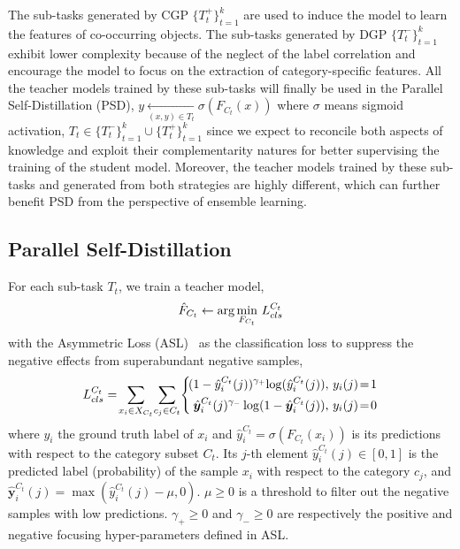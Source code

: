 \documentclass{article}
\begin{document}
The sub-tasks generated by CGP $\{T^+_t\}_{t=1}^k$ are used to induce the model to learn the features of co-occurring objects. The sub-tasks generated by DGP $\{T^-_t\}_{t=1}^k$ exhibit lower complexity because of the neglect of the label correlation and encourage the model to focus on the extraction of category-specific features. All the teacher models trained by these sub-tasks will finally be used in the Parallel Self-Distillation (PSD), $y\underset{(x,y)\in T_t}\leftarrow \sigma(F_{C_t}(x))$ where $\sigma$ means sigmoid activation, $T_t \in \{T^-_t\}_{t=1}^k\cup\{T^+_t\}_{t=1}^k$ since we expect to reconcile both aspects of knowledge and exploit their complementarity natures for better supervising the training of the student model. Moreover, the teacher models trained by these sub-tasks and generated from both strategies are highly different, which can further benefit PSD from the perspective of ensemble learning.

\vspace{-0.15cm}
\subsection{Parallel Self-Distillation}
\vspace{-0.05cm}

For each sub-task $T_t$, we train a teacher model,
\begin{equation}\label{teacher_train}
\setlength{\abovedisplayskip}{3pt}
\setlength{\belowdisplayskip}{1mm}
\hat{F}_{C_t}\leftarrow\arg\underset{F_{C_t}}\min~L^{C_t}_{cls}
\end{equation}
with the Asymmetric Loss (ASL)~\cite{ridnik2021asymmetric} as the classification loss to suppress the negative effects from superabundant negative samples,
{\small
\begin{equation}\label{asl}
    \setlength{\abovedisplayskip}{3pt}
    \setlength{\belowdisplayskip}{1mm}
        L^{C_t}_{cls}=\!\sum_{x_i \in X_{C_t}}\!\sum_{c_j\in C_t}\!
        \left\{
            \begin{aligned}
                \!(1-\hat{y}_i^{C_t}(j))^{\gamma_+}\!\log(\hat{y}_i^{C_t}(j)),&~y_i(j)\!=\!1\\
                \!\hat{\bm{y}}_i^{C_t}(j)^{\gamma_-}\log(1-\hat{\bm{y}}_i^{C_t}(j)),&~y_i(j)\!=\!0\\
            \end{aligned}
        \right.
    \end{equation}}
where $y_i$ the ground truth label of $x_i$ and $\hat{y}_i^{C_t}=\sigma(F_{C_t}(x_i))$ is its predictions with respect to the category subset $C_t$. Its $j$-th element $\hat{y}_i^{C_t}(j)\in [0,1]$ is the predicted label (probability) of the sample $x_i$ with respect to the category $c_j$, and ${\bm{\hat{y}}}_i^{C_t}(j)=\max(\hat{y}_i^{C_t}(j)-\mu, 0)$. $\mu\geq 0$ is a threshold to filter out the negative samples with low predictions. $\gamma_+\geq 0$ and $\gamma_-\geq 0$ are respectively the positive and negative focusing hyper-parameters defined in ASL.
\end{document}
